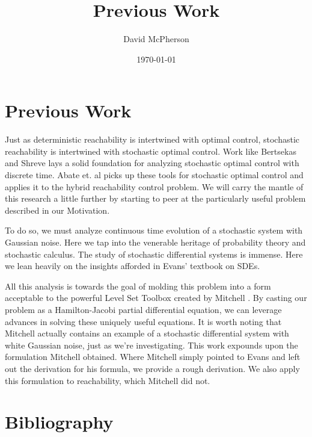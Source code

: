 \documentclass[a4paper]{article}
\title{Previous Work}
\author{David McPherson}
\date{\today}
\begin{document}
\cite{KeneJaime}

\section{Previous Work}
Just as deterministic reachability is intertwined with optimal control, stochastic reachability is intertwined with stochastic optimal control.
Work like Bertsekas and Shreve \cite{Bertsekas} lays a solid foundation for analyzing stochastic optimal control with discrete time.
Abate et. al \cite{AbateStoch} picks up these tools for stochastic optimal control and applies it to the hybrid reachability control problem.
We will carry the mantle of this research a little further by starting to peer at the particularly useful problem described in our Motivation.

To do so, we must analyze continuous time evolution of a stochastic system with Gaussian noise.
Here we tap into the venerable heritage of probability theory and stochastic calculus.
The study of stochastic differential systems is immense.
Here we lean heavily on the insights afforded in Evans' textbook on SDEs\cite{EvansSDE}.

All this analysis is towards the goal of molding this problem into a form acceptable to the powerful Level Set Toolbox created by Mitchell \cite{MitchellToolbox}.
By casting our problem as a Hamilton-Jacobi partial differential equation, we can leverage advances in solving these uniquely useful equations.
It is worth noting that Mitchell \cite{MitchellToolbox} actually contains an example of a stochastic differential system with white Gaussian noise, just as we're investigating.
This work expounds upon the formulation Mitchell obtained.
Where Mitchell simply pointed to Evans \cite{EvansSDE} and left out the derivation for his formula, we provide a rough derivation.
We also apply this formulation to reachability, which Mitchell did not.

\section{Bibliography}

  
  
\end{document}
